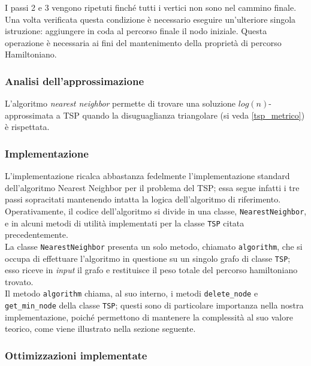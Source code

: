 I passi 2 e 3 vengono ripetuti finché tutti i vertici non sono nel cammino finale. Una volta verificata questa condizione è necessario eseguire un'ulteriore singola istruzione: aggiungere in coda al percorso finale il nodo iniziale. Questa operazione è necessaria ai fini del mantenimento della proprietà di percorso Hamiltoniano. \\

\subsubsection{Analisi dell'approssimazione}

L'algoritmo \textit{nearest neighbor} permette di trovare una soluzione $log(n)$-approssimata a TSP quando la disuguaglianza triangolare (si veda \ref{tsp_metrico}) è rispettata.

\subsubsection{Implementazione}

L'implementazione ricalca abbastanza fedelmente l'implementazione standard dell'algoritmo Nearest Neighbor per il problema del TSP; essa segue infatti i tre passi sopracitati mantenendo intatta la logica dell'algoritmo di riferimento. \\
Operativamente, il codice dell'algoritmo si divide in una classe, \texttt{NearestNeighbor}, e in alcuni metodi di utilità implementati per la classe \texttt{TSP} citata precedentemente. \\
La classe \texttt{NearestNeighbor} presenta un solo metodo, chiamato \texttt{algorithm}, che si occupa di effettuare l'algoritmo in questione su un singolo grafo di classe \texttt{TSP}; esso riceve in \textit{input} il grafo e restituisce il peso totale del percorso hamiltoniano trovato. \\
Il metodo \texttt{algorithm} chiama, al suo interno, i metodi \texttt{delete\_node} e \texttt{get\_min\_node} della classe \texttt{TSP}; questi sono di particolare importanza nella nostra implementazione, poiché permettono di mantenere la complessità al suo valore teorico, come viene illustrato nella sezione seguente.

\subsubsection{Ottimizzazioni implementate}

